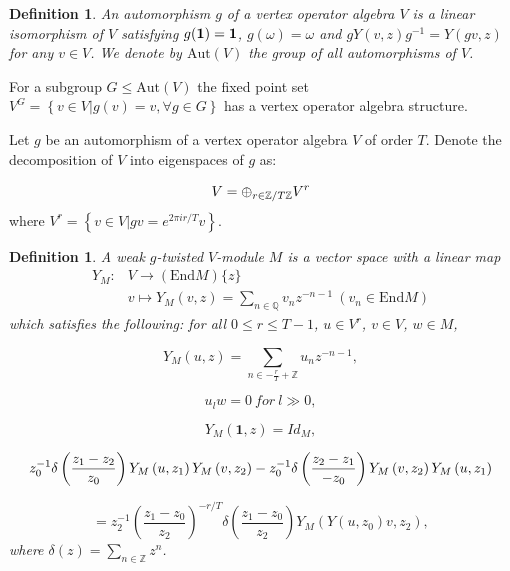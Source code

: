 \documentclass{article}
\newtheorem{definition}[lemma]{Definition}
\begin{document}
	\begin{definition} An \emph{automorphism} $g$ of a vertex operator
		algebra $V$ is a linear isomorphism of $V$ satisfying $g(\bf{1})=\bf{1}$, $g\left(\omega\right)=\omega$
		and $gY\left(v,z\right)g^{-1}=Y\left(gv,z\right)$ for any $v\in V$.
		We denote by $\mbox{Aut}\left(V\right)$ the group of all automorphisms
		of $V$. \end{definition}
	
	For a subgroup $G\le\mbox{Aut}\left(V\right)$ the fixed point set
	$V^{G}=\left\{ v\in V|g\left(v\right)=v,\forall g\in G\right\} $
	has a vertex operator algebra structure.
	
	Let $g$ be an automorphism of a vertex operator algebra $V$ of order
	$T$. Denote the decomposition of $V$ into eigenspaces of $g$ as:
	
	\[
	V=\oplus_{r\in\mathbb{Z}/T\text{\ensuremath{\mathbb{Z}}}}V^{r}
	\]
	where $V^{r}=\left\{ v\in V|gv=e^{2\pi ir/T}v\right\} $.
	
	\begin{definition} A \emph{weak $g$-twisted $V$-module} $M$ is
		a vector space with a linear map
		\begin{align*}
			Y_{M}: & V\to\left(\text{End}M\right)\{z\}\\
			& v\mapsto Y_{M}\left(v,z\right)=\sum_{n\in\mathbb{Q}}v_{n}z^{-n-1}\ \left(v_{n}\in\mbox{End}M\right)
		\end{align*}
		which satisfies the following: for all $0\le r\le T-1$, $u\in V^{r}$,
		$v\in V$, $w\in M$,
		
		\[
		Y_{M}\left(u,z\right)=\sum_{n\in-\frac{r}{T}+\mathbb{Z}}u_{n}z^{-n-1},
		\]
		
		\[
		u_{l}w=0\ for\ l\gg0,
		\]
		
		\[
		Y_{M}\left(\mathbf{1},z\right)=Id_{M},
		\]
		
		\[
		z_{0}^{-1}\text{\ensuremath{\delta}}\left(\frac{z_{1}-z_{2}}{z_{0}}\right)Y_{M}\left(u,z_{1}\right)Y_{M}\left(v,z_{2}\right)-z_{0}^{-1}\delta\left(\frac{z_{2}-z_{1}}{-z_{0}}\right)Y_{M}\left(v,z_{2}\right)Y_{M}\left(u,z_{1}\right)
		\]
		
		\begin{equation}
			=z_{2}^{-1}\left(\frac{z_{1}-z_{0}}{z_{2}}\right)^{-r/T}\delta\left(\frac{z_{1}-z_{0}}{z_{2}}\right)Y_{M}\left(Y\left(u,z_{0}\right)v,z_{2}\right),\label{Jacobi for twisted V-module}
		\end{equation}
		where $\delta\left(z\right)=\sum_{n\in\mathbb{Z}}z^{n}$.
		
	\end{definition}
	
\end{document}
